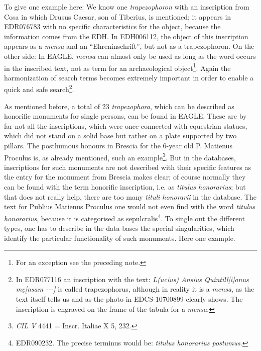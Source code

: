 \documentclass[amsthm,ebook]{saparticle}
\begin{document}
To give one example here: We know one \textit{trapezophoron } with an inscription 
from Cosa in which Drusus Caesar, son of Tiberius, is mentioned; it appears in 
EDR076783 with no specific characteristics for the object, because the information 
comes from the EDH. In EDH006112, the object of this inscription appears as a \textit{mensa} 
and an ``Ehreninschrift'', but not as a trapezophoron. On the other side: In EAGLE, 
\textit{mensa }can almost only be used as long as the word occurs in the inscribed 
text, not as term for an archaeological object\footnote{For an exception see the preceding note.}. Again the harmonization of search 
terms becomes extremely important in order to enable a quick and safe search\footnote{In EDR077116 an inscription with the text: \emph{L(ucius) Ansius Quintill[i]anus m\d{e}[nsam -{}-{}-]} is called trapezophorus, although in reality it is a \emph{mensa}, as the text itself tells us and as the photo in EDCS-10700899 clearly shows. The inscription is engraved on the frame of the tabula for a \emph{mensa}.}.

As mentioned before, a total of 23 \textit{trapezophora}, which can be described 
as honorific monuments for single persons, can be found in EAGLE. These are by 
far not all the inscriptions, which were once connected with equestrian statues, 
which did not stand on a solid base but rather on a plate supported by two pillars. 
The posthumous honours in Brescia for the 6-year old P. Matienus Proculus is, as 
already mentioned, such an example\footnote{\emph{CIL V} 4441 = Inscr. Italiae X 5, 232.}. But in the databases, inscriptions for such 
monuments are not described with their specific features\textbf{ }as\textbf{ }the 
entry for the monument from Brescia makes clear; of course normally they can be 
found with the term honorific inscription, i.e. as \textit{titulus honorarius}; 
but that does not really help, there are too many \textit{tituli honorarii }in 
the database. The text for Publius Matienus Proculus one would not even find with 
the word \textit{titulus honorarius}, because it is categorised as sepulcralis\footnote{EDR090232. The precise terminus would be: \emph{titulus honorarius postumus}.}. 
To single out the different types, one has to describe in the data bases the special 
singularities, which identify the particular functionality of such monuments. Here 
one example.
\end{document}
